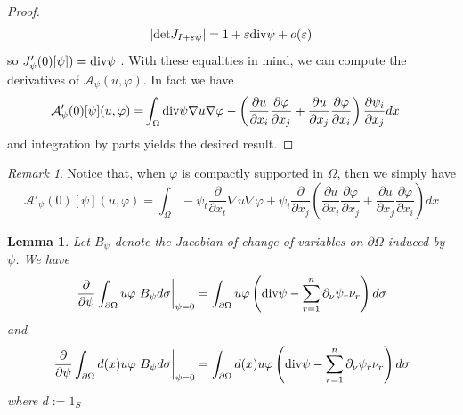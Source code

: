 \documentclass[a4paper,reqno,11pt,oneside]{amsart}
\theoremstyle{plain}
\theoremstyle{plain}
\newtheorem{lem}[thm]{Lemma}
\theoremstyle{plain}
\theoremstyle{remark}
\newtheorem*{rem*}{Remark}
\def\div{\textup{div}}
\begin{document}
\begin{proof}
\begin{equation}
    \label{derjacobiano}
|\mathrm{det}J_{I+\varepsilon \psi}|=1+\varepsilon \div\psi +o(\varepsilon)
\end{equation}
so $J_\psi'(0)[\psi])=\div\psi$ . With these equalities in mind, we can compute the derivatives of $\mathcal{A}_\psi(u,\varphi)$. In fact we have
\begin{eqnarray*}
    \mathcal{A}'_\psi(0)[\psi](u,\varphi)=&\int_\Omega\div\psi \nabla u\nabla \varphi - \left(\frac{\partial u}{\partial x_i}\frac{\partial \varphi}{\partial x_j}+
\frac{\partial u}{\partial x_j}\frac{\partial \varphi}{\partial x_i}
\right)\frac{\partial \psi_i}{ \partial x_j}dx
\end{eqnarray*} 
and integration by parts yields the desired result.
\end{proof}
\begin{rem*}
    Notice that, when $\varphi$ is compactly supported in $\Omega$, then we simply have 
\begin{equation} \label{suppcomp}
\mathcal{A}'_\psi(0)[\psi](u,\varphi)=
\int_\Omega-\psi_t \frac{\partial}{\partial x_t} \nabla u\nabla \varphi + \psi_i\frac{\partial }{ \partial x_j}\left(\frac{\partial u}{\partial x_i}\frac{\partial \varphi}{\partial x_j}+
\frac{\partial u}{\partial x_j}\frac{\partial \varphi}{\partial x_i}
\right) dx
\end{equation}
    
\end{rem*}
\begin{lem}\label{lem:B}
    Let $B_\psi$ denote the Jacobian of change of variables on $\partial \Omega$ induced by $\psi$. We have 
$$
\left. \frac{\partial}{\partial \psi}\int_{\partial \Omega} u\varphi\ B_\psi d\sigma\right|_{\psi=0}=\int_{\partial \Omega} u\varphi 
\left(
\div \psi -\sum_{r=1}^n %
\partial_\nu \psi_r \nu_r\right)d\sigma
 $$
and
$$
\left. \frac{\partial}{\partial \psi}\int_{\partial \Omega}d(x)  u\varphi\ B_\psi d\sigma\right|_{\psi=0}=\int_{\partial \Omega} d(x)u\varphi
     \left(\div \psi -\sum_{r=1}^n \partial_\nu \psi_r \nu_r\right)d\sigma    
$$where $d:=1_S$
\end{lem}
\end{document}

